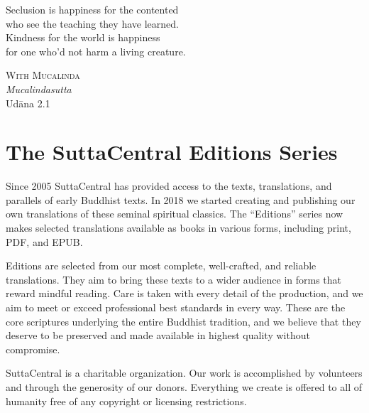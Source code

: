 \documentclass[12pt,openany]{book}%
\newcommand{\blankpage}{
\newpage
\thispagestyle{empty}
\mbox{}
\newpage
}
\newcommand*{\epigraphTranslatedTitle}[1]{\vspace*{.5em}\footnotesize\textsc{#1}\\}%
\newcommand*{\epigraphRootTitle}[1]{\footnotesize\textit{#1}\\}%
\newcommand*{\epigraphReference}[1]{\footnotesize{#1}}%
\begin{document}
\newpage

\setlength{\parindent}{1.5em}%
\newpage

\vspace*{\fill}

\begin{center}
\epigraph{Seclusion is happiness for the contented\\
who see the teaching they have learned.\\
Kindness for the world is happiness\\
for one who’d not harm a living creature.}
{
\epigraphTranslatedTitle{With Mucalinda}
\epigraphRootTitle{Mucalindasutta}
\epigraphReference{\textsanskrit{Udāna} 2.1}
}
\end{center}

\vspace*{2in}

\vspace*{\fill}

\blankpage%

\setlength{\parindent}{1em}
%
\tableofcontents
\newpage
\pagestyle{fancy}
%
\chapter*{The SuttaCentral Editions Series}

Since 2005 SuttaCentral has provided access to the texts, translations, and parallels of early Buddhist texts. In 2018 we started creating and publishing our own translations of these seminal spiritual classics. The “Editions” series now makes selected translations available as books in various forms, including print, PDF, and EPUB.

Editions are selected from our most complete, well-crafted, and reliable translations. They aim to bring these texts to a wider audience in forms that reward mindful reading. Care is taken with every detail of the production, and we aim to meet or exceed professional best standards in every way. These are the core scriptures underlying the entire Buddhist tradition, and we believe that they deserve to be preserved and made available in highest quality without compromise.

SuttaCentral is a charitable organization. Our work is accomplished by volunteers and through the generosity of our donors. Everything we create is offered to all of humanity free of any copyright or licensing restrictions. 
\end{document}
